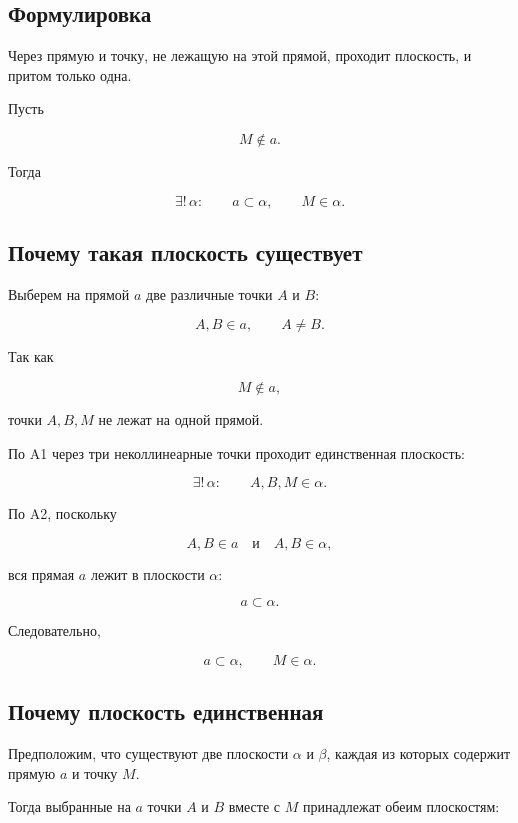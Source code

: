 \documentclass[a4paper,12pt]{article}
\begin{document}
\subsection{Формулировка}

Через прямую и точку, не лежащую на этой прямой,
проходит плоскость, и притом только одна.

Пусть

\[
M\notin a.
\]

Тогда

\[
\boxed{
\exists!\,\alpha:
\qquad
a\subset\alpha,
\qquad
M\in\alpha.
}
\]


\subsection{Почему такая плоскость существует}

Выберем на прямой \(a\) две различные точки \(A\) и \(B\):

\[
A,B\in a,
\qquad
A\ne B.
\]

Так как

\[
M\notin a,
\]

точки \(A,B,M\) не лежат на одной прямой.

По A1 через три неколлинеарные точки проходит единственная плоскость:

\[
\exists!\,\alpha:
\qquad
A,B,M\in\alpha.
\]

По A2, поскольку

\[
A,B\in a
\quad\text{и}\quad
A,B\in\alpha,
\]

вся прямая \(a\) лежит в плоскости \(\alpha\):

\[
a\subset\alpha.
\]

Следовательно,

\[
a\subset\alpha,
\qquad
M\in\alpha.
\]


\subsection{Почему плоскость единственная}

Предположим, что существуют две плоскости
\(\alpha\) и \(\beta\), каждая из которых содержит
прямую \(a\) и точку \(M\).

Тогда выбранные на \(a\) точки \(A\) и \(B\) вместе с \(M\)
принадлежат обеим плоскостям:
\end{document}

